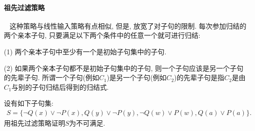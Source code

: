 \paragraph{祖先过滤策略}~{}
这种策略与线性输入策略有点相似, 但是, 放宽了对子句的限制. 每次参加归结的两个亲本子句, 只要满足以下两个条件中的任意一个就可进行归结:

(1) 两个亲本子句中至少有一个是初始子句集中的子句.

(2) 如果两个亲本子句都不是初始子句集中的子句, 则一个子句应该是另一个子句的先辈子句. 所谓一个子句(例如$C_1$)是另一个子句(例如$C_2$)的先辈子句是指$C_2$是由$C_1$与别的子句归结后得到的归结式.
\begin{example}
设有如下子句集:
\begin{align}
  S=\{\neg Q(x)\vee \neg P(x),  Q(y)\vee \neg P(y), \neg Q(w)\vee P(w) ,  Q(a)\vee P(a)\}.
\end{align}
用祖先过滤策略证明$S$为不可满足.
\end{example}
